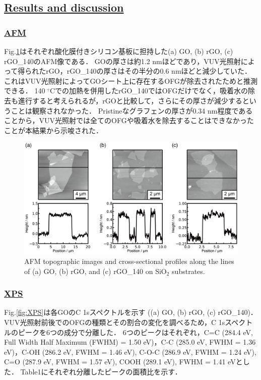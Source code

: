 \documentclass[platex,dvipdfmx]{jlreq}			%
\begin{document}
\subsection*{\ul{Results and discussion}}

\subsubsection*{\ul{AFM}}
Fig.\ref{fig:AFM}はそれぞれ酸化膜付きシリコン基板に担持した(a) GO, (b) rGO, (c) rGO\_140のAFM像である．
GOの厚さは約1.2 nmほどであり，VUV光照射によって得られたrGO，rGO\_140の厚さはその半分の0.6 nmほどと減少していた．
これはVUV光照射によってGOシート上に存在するOFGが除去されたためと推測できる．
140 ${}^\circ$Cでの加熱を併用したrGO\_140ではOFGだけでなく，吸着水の除去も進行すると考えられるが，rGOと比較して，さらにその厚さが減少するということは観察されなかった．
Pristineなグラフェンの厚さが0.34 nm程度であることから，VUV光照射では全てのOFGや吸着水を除去することはできなかったことが本結果から示唆された．

\begin{figure}
    \centering
    \includegraphics[width=150mm]{figures/figure2.png}
    \caption{AFM topographic images and cross-sectional profiles along the lines of (a) GO, (b) rGO, and (c) rGO\_140 on SiO$_2$ substrates.}
    \label{fig:AFM}
\end{figure}

\subsubsection*{\ul{XPS}}
Fig.\ref{fig:XPS}は各GOのC 1sスペクトルを示す ((a) GO, (b) rGO, (c) rGO\_140)．
VUV光照射前後でのOFGの種類とその割合の変化を調べるため，C 1sスペクトルのピークを6つの成分で分離した．
6つのピークはそれぞれ，C=C (284.4 eV, Full Width Half Maximum (FWHM) = 1.50 eV)，C-C (285.0 eV, FWHM = 1.36 eV)，C-OH (286.2 eV, FWHM = 1.46 eV), C-O-C (286.9 eV, FWHM = 1.24 eV), C=O (287.9 eV, FWHM = 1.57 eV), COOH (289.1 eV), FWHM = 1.41 eVとした．
Table1にそれぞれ分離したピークの面積比を示す．
\end{document}

